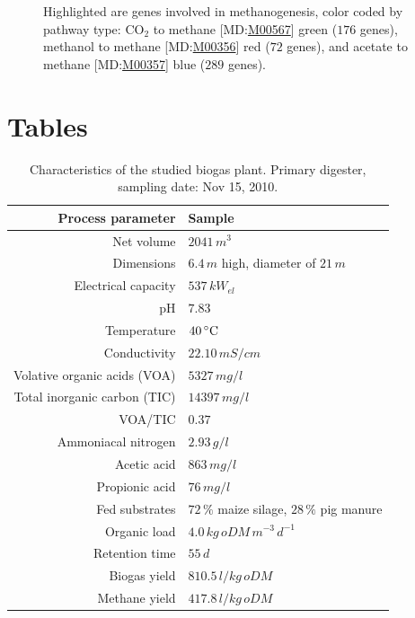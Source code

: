 \documentclass{bmcart}
\begin{document}
\begin{backmatter}
\begin{figure}[h!]
\caption{ Highlighted are genes involved in methanogenesis, color coded by pathway type: CO$_{\text{2}}$ to methane [MD:\href{http://www.kegg.jp/kegg-bin/show_module?M00567}{M00567}] green ($176$ genes), methanol to methane [MD:\href{http://www.kegg.jp/kegg-bin/show_module?M00356}{M00356}] red ($72$ genes), and acetate to methane [MD:\href{http://www.kegg.jp/kegg-bin/show_module?M00357}{M00357}] blue ($289$ genes).}
\label{fCoverage}
\end{figure}



\newpage
\section*{Tables}
\begin{table}[h!]
\caption{Characteristics of the studied biogas plant. Primary digester, sampling date: Nov 15, 2010.}
\begin{tabular}{rl}
\hline
Process parameter & Sample\\
\hline
Net volume & $2041\,m^{3}$\\
Dimensions & $6.4\,m$ high, diameter of $21\,m$\\
Electrical capacity & $537\,kW_{el}$\\
\hline
pH & $7.83$\\
Temperature & $40\,^{\circ}{\rm C}$\\
Conductivity & $22.10\,mS/cm$\\
Volative organic acids (VOA) & $5327\,mg/l$\\
Total inorganic carbon (TIC) & $14397\,mg/l$\\
VOA/TIC & $0.37$\\
Ammoniacal nitrogen & $2.93\,g/l$\\
Acetic acid & $863\,mg/l$\\
Propionic acid & $76\,mg/l$\\
\hline
Fed substrates & $72\,\%$ maize silage, $28\,\%$ pig manure\\
Organic load & $4.0\,kg\,oDM\,m^{-3}\,d^{-1}$\\
Retention time & $55\,d$\\
Biogas yield & $810.5\,l/kg\,oDM$\\
Methane yield & $417.8\,l/kg\,oDM$\\
\hline
\end{tabular}
\label{tBiogasPlant}
\end{table}


\end{backmatter}
\end{document}
